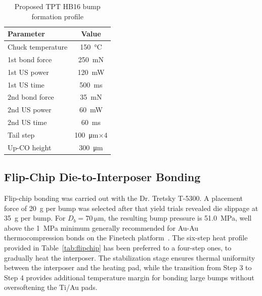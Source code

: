 \documentclass[conference]{IEEEtran}
\begin{document}
\begin{table}[htbp]
    \caption{Proposed TPT HB16 bump formation profile} \label{tab:bump_param}
    \centering
    \begin{tabular}{|l|c|}
        \hline
        \textbf{Parameter}  & \textbf{Value} \\ \hline
        Chuck temperature   & \SI{150}{\celsius} \\
        1st bond force      & \SI{250}{mN} \\
        1st US power        & \SI{120}{mW} \\
        1st US time         & \SI{500}{ms} \\
        2nd bond force      & \SI{35}{mN} \\
        2nd US power        & \SI{60}{mW} \\
        2nd US time         & \SI{60}{ms} \\
        Tail step           & \SI{100}{\micro\metre}\(\times4\)\\
        Up-CO height        & \SI{300}{\micro\metre} \\ \hline
    \end{tabular}
\end{table}

\subsection{Flip-Chip Die-to-Interposer Bonding}\label{subsec:flipchip}
Flip-chip bonding was carried out with the Dr. Tretsky T-5300. A
placement force of \SI{20}{g} per bump was selected after that yield trials revealed
die slippage at \SI{35}{g} per bump.  For \(D_b=\SI{70}{\micro\metre}\), the resulting bump pressure is \SI{51.0}{\MPa}, well above the \SI{1}{MPa} minimum generally recommended for Au-Au thermocompression bonds on the Finetech platform~\cite{Deng2016}. The six-step heat profile provided in Table~\ref{tab:flipchip} has been preferred to a four-step ones, to gradually heat the interposer. The stabilization stage ensures thermal uniformity between the interposer and the heating pad, while the transition from Step 3 to Step 4 provides additional temperature margin for bonding large bumps without oversoftening the Ti/Au pads.
\end{document}
